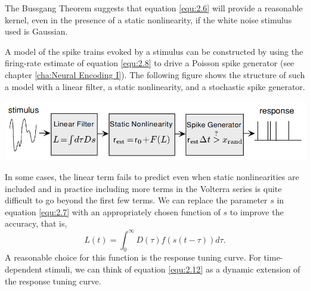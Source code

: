 \begin{rem}
  The Bussgang Theorem suggests that equation \ref{equ:2.6} will provide a reasonable kernel, even in the presence of a static nonlinearity, if the white noise stimulus used is Gaussian.
\end{rem}

\begin{exm}
  A model of the spike trains evoked by a stimulus can be constructed by using the firing-rate estimate of equation \ref{equ:2.8} to drive a Poisson spike generator (see chapter \ref{cha:Neural Encoding I}). The following figure shows the structure of such a model with a linear filter, a static nonlinearity, and a stochastic spike generator.
  \begin{center}
    \includegraphics[scale=0.3]{./png/nonlinearGenerator}
  \end{center}
\end{exm}


\begin{rem}
  In some cases, the linear term fails to predict even when static nonlinearities are included and in practice including more terms in the Volterra series is quite difficult to go beyond the first few terms. We can replace the parameter $s$ in equation \ref{equ:2.7} with an appropriately chosen function of $s$ to improve the accuracy, that is,
  \begin{equation}
    \label{equ:2.12}
    L(t) = \int_0^{\infty}D(\tau)f(s(t-\tau))d\tau.
  \end{equation}
  A reasonable choice for this function is the response tuning curve.
  For time-dependent stimuli, we can think of equation \ref{equ:2.12} as a dynamic extension of the response tuning curve.
\end{rem}




 









